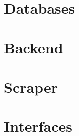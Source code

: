 %
%

\chapter{Databases}


%
%

\chapter{Backend}



%
%

\chapter{Scraper}


%
%

\chapter{Interfaces}
